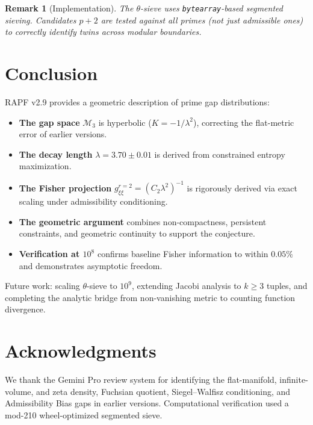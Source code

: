 \documentclass[12pt]{article}
\newtheorem{remark}[theorem]{Remark}
\begin{document}
\begin{remark}[Implementation]
The $\theta$-sieve uses \texttt{bytearray}-based segmented sieving. Candidates
$p+2$ are tested against \textit{all} primes (not just admissible ones) to
correctly identify twins across modular boundaries.
\end{remark}

\section{Conclusion}

RAPF v2.9 provides a geometric description of prime gap distributions:

\begin{itemize}
  \item \textbf{The gap space} $\mathcal{M}_3$ is hyperbolic ($K = -1/\lambda^2$),
    correcting the flat-metric error of earlier versions.
  \item \textbf{The decay length} $\lambda = 3.70 \pm 0.01$ is derived from
    constrained entropy maximization.
  \item \textbf{The Fisher projection} $g_{\xi\xi}^{r=2} = (C_2\lambda^2)^{-1}$
    is rigorously derived via exact scaling under admissibility conditioning.
  \item \textbf{The geometric argument} combines non-compactness, persistent
    constraints, and geometric continuity to support the conjecture.
  \item \textbf{Verification at $10^8$} confirms baseline Fisher information
    to within $0.05\%$ and demonstrates asymptotic freedom.
\end{itemize}

Future work: scaling $\theta$-sieve to $10^9$, extending Jacobi analysis to
$k \geq 3$ tuples, and completing the analytic bridge from non-vanishing
metric to counting function divergence.

\section*{Acknowledgments}

We thank the Gemini Pro review system for identifying the flat-manifold, infinite-volume, and zeta
density, Fuchsian quotient, Siegel--Walfisz conditioning, and Admissibility Bias gaps in earlier versions. Computational
verification used a mod-210 wheel-optimized segmented sieve.
\end{document}
